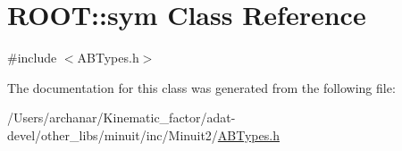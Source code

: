 \hypertarget{classROOT_1_1Minuit2_1_1sym}{}\section{R\+O\+OT\+:\+:sym Class Reference}
\label{classROOT_1_1Minuit2_1_1sym}


{\ttfamily \#include $<$A\+B\+Types.\+h$>$}



The documentation for this class was generated from the following file\+:\begin{DoxyCompactItemize}
\item 
/\+Users/archanar/\+Kinematic\+\_\+factor/adat-\/devel/other\+\_\+libs/minuit/inc/\+Minuit2/\mbox{\hyperlink{adat-devel_2other__libs_2minuit_2inc_2Minuit2_2ABTypes_8h}{A\+B\+Types.\+h}}\end{DoxyCompactItemize}

